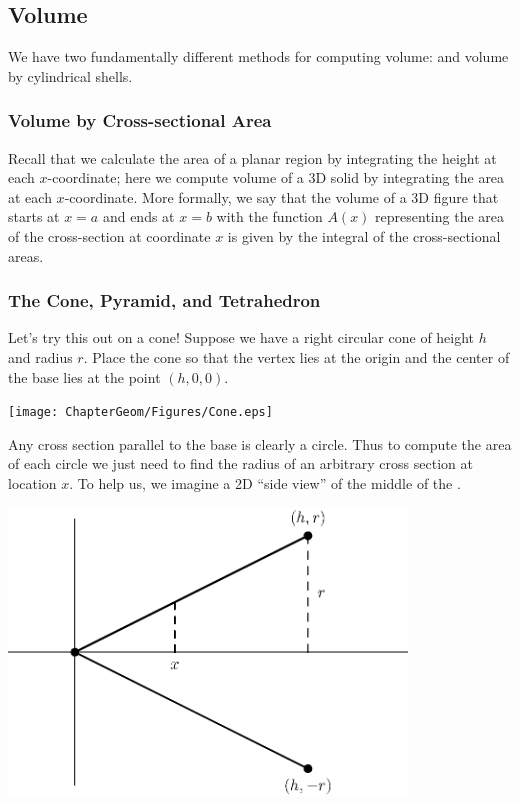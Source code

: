 \subsection{Volume}\label{Volume}

We have two fundamentally different methods for computing volume:  and volume by cylindrical shells.

\subsubsection{Volume by Cross-sectional Area}

Recall that we calculate the area of a planar region by integrating the height at each $x$-coordinate; here we compute volume of a 3D solid by integrating the area at each $x$-coordinate.  More formally, we say that the volume of a 3D figure that starts at $x = a$ and ends at $x = b$ with the function $A(x)$ representing the area of the cross-section at
coordinate $x$ is given by the integral of the cross-sectional areas.

 
\subsubsection{The Cone, Pyramid, and Tetrahedron}
Let's try this out on a cone!  Suppose we have a right circular cone of height $h$ and radius $r$.  Place the cone so that the vertex lies at the origin and the center of the base lies at the point $(h,0,0)$. 

	\begin{center}
		\texttt{[image: ChapterGeom/Figures/Cone.eps]}
	\end{center}


Any cross section parallel to the base is clearly a circle.  Thus to compute the area of each circle we just need to find the radius of an arbitrary cross section at location $x$.  To help us, we imagine a 2D ``side view'' of the middle of the .

	\begin{center}
		\includegraphics[width=300pt]{ChapterGeom/Figures/conetriangle.eps}
	\end{center} 

